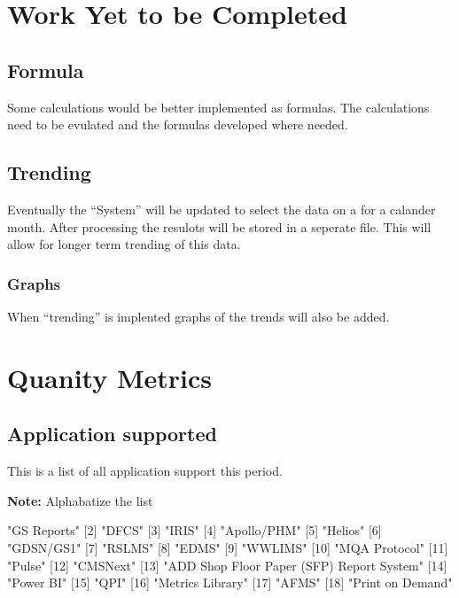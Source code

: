 \documentclass{article}
\begin{document}
\section{Work Yet to be Completed}
\subsection{Formula}
Some calculations would be better implemented as formulas. The calculations need
to be evulated and the formulas developed where needed.
\subsection{Trending}
Eventually the ``System'' will be updated to select the data on a for a calander
month. After processing the resulots will be stored in a seperate file.
This will allow for longer term trending of this data.
\subsubsection{Graphs}
When ``trending'' is implented graphs of the trends will also be added.


\section{Quanity Metrics}
\subsection{Application supported}
This is a list of all application support this period.

\textbf{Note:} Alphabatize the list

\begin{Schunk}
\begin{Soutput}
 [1] "GS Reports"                              
 [2] "DFCS"                                    
 [3] "IRIS"                                    
 [4] "Apollo/PHM"                              
 [5] "Helios"                                  
 [6] "GDSN/GS1"                                
 [7] "RSLMS"                                   
 [8] "EDMS"                                    
 [9] "WWLIMS"                                  
[10] "MQA Protocol"                            
[11] "Pulse"                                   
[12] "CMSNext"                                 
[13] "ADD Shop Floor Paper (SFP) Report System"
[14] "Power BI"                                
[15] "QPI"                                     
[16] "Metrics Library"                         
[17] "AFMS"                                    
[18] "Print on Demand"                         
\end{Soutput}
\end{Schunk}
\end{document}
